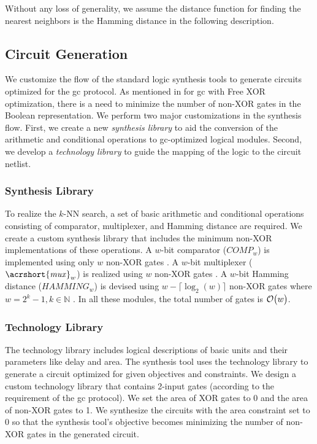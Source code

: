 Without any loss of generality, we assume the distance function for finding the nearest neighbors is the Hamming distance in the following description.

\subsection{Circuit Generation}\label{ssec:knn-circuitgen}
We customize the flow of the standard logic synthesis tools to generate circuits optimized for the \acrshort{gc} protocol.
As mentioned in  for \acrshort{gc} with Free XOR optimization, there is a need to minimize the number of non-XOR gates in the Boolean representation.
We perform two major customizations in the synthesis flow.
First, we create a new \emph{synthesis library} to aid the conversion of the arithmetic and conditional operations to \acrshort{gc}-optimized logical modules.
Second, we develop a \emph{technology library} to guide the mapping of the logic to the circuit \gls{netlist}.

\subsubsection{Synthesis Library}
To realize the $k$-NN search, a set of basic arithmetic and conditional operations consisting of comparator, multiplexer, and Hamming distance are required.
We create a custom synthesis library that includes the minimum non-XOR implementations of these operations.
A $w$-bit comparator ($\mathit{COMP}_w$) is implemented using only $w$ non-XOR gates \cite{kolesnikov2009improved}.
A $w$-bit multiplexer ($\mathit{\acrshort{mux}}_w$) is realized using $w$ non-XOR gates \cite{kolesnikov2008improved}.
A $w$-bit Hamming distance ($\mathit{HAMMING}_w$) is devised using $w-\lceil \log _2(w) \rceil$ non-XOR gates where $w=2^k-1, k \in \mathbb{N}$ \cite{boyar2006concrete}.
In all these modules, the total number of gates is $\mathcal{O}\bigl(w\bigr)$.

\subsubsection{Technology Library}
The technology library includes logical descriptions of basic units and their parameters like delay and area.
The synthesis tool uses the technology library to generate a circuit optimized for given objectives and constraints.
We design a custom technology library that contains 2-input gates (according to the requirement of the \acrshort{gc} protocol).
We set the area of XOR gates to 0 and the area of non-XOR gates to 1.
We synthesize the circuits with the area constraint set to 0 so that the synthesis tool's objective becomes minimizing the number of non-XOR gates in the generated circuit.


